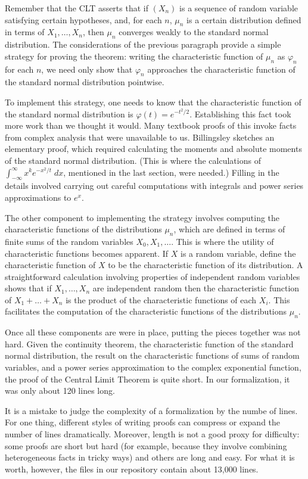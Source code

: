 \documentclass{article}
\newcommand{\ph}{\varphi}
\begin{document}
Remember that the CLT asserts that if $(X_n)$ is a sequence of random variable satisfying certain hypotheses, and, for each $n$, $\mu_n$ is a certain distribution defined in terms of $X_1, \ldots, X_n$, then $\mu_n$ converges weakly to the standard normal distribution. The considerations of the previous paragraph provide a simple strategy for proving the theorem: writing the characteristic function of $\mu_n$ as $\ph_n$ for each $n$, we need only show that $\ph_n$ approaches the characteristic function of the standard normal distribution pointwise.

To implement this strategy, one needs to know that the characteristic function of the standard normal distribution is $\ph(t) = e^{-t^2/2}$. Establishing this fact took more work than we thought it would. Many textbook proofs of this invoke facts from complex analysis that were unavailable to us. Billingsley \cite[page 344]{billingsley:95} sketches an elementary proof, which required calculating the moments and absolute moments of the standard normal distribution. (This is where the calculations of $\int_{-\infty}^\infty x^k e^{-x^2 / t} \; dx$, mentioned in the last section, were needed.) Filling in the details involved carrying out careful computations with integrals and power series approximations to $e^x$.

The other component to implementing the strategy involves computing the characteristic functions of the distributions $\mu_n$, which are defined in terms of finite sums of the random variables $X_0, X_1, \ldots$. This is where the utility of characteristic functions becomes apparent. If $X$ is a random variable, define the characteristic function of $X$ to be the characteristic function of its distribution. A straightforward calculation involving properties of independent random variables shows that if $X_1, \ldots, X_n$ are independent random then the characteristic function of $X_1 + \ldots + X_n$ is the product of the characteristic functions of each $X_i$. This facilitates the computation of the characteristic functions of the distributions $\mu_n$. 

Once all these components are were in place, putting the pieces together was not hard. Given the continuity theorem, the characteristic function of the standard normal distribution, the result on the characteristic functions of sums of random variables, and a power series approximation to the complex exponential function, the proof of the Central Limit Theorem is quite short. In our formalization, it was only about 120 lines long. 

It is a mistake to judge the complexity of a formalization by the numbe of lines. For one thing, different styles of writing proofs can compress or expand the number of lines dramatically. Moreover, length is not a good proxy for difficulty: some proofs are short but hard (for example, because they involve combining heterogeneous facts in tricky ways) and others are long and easy. For what it is worth, however, the files in our repository contain about 13,000 lines.



\end{document}
